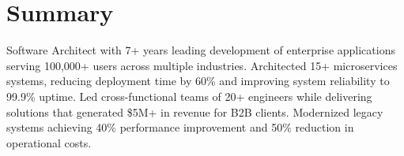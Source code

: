 \documentclass[letterpaper,11pt]{article}
\begin{document}





\section{Summary}
  Software Architect with 7+ years leading development of enterprise applications serving 100,000+ users across multiple industries.
  Architected 15+ microservices systems, reducing deployment time by 60\% and improving system reliability to 99.9\% uptime.
  Led cross-functional teams of 20+ engineers while delivering solutions that generated \$5M+ in revenue for B2B clients.
  Modernized legacy systems achieving 40\% performance improvement and 50\% reduction in operational costs.









\end{document}
